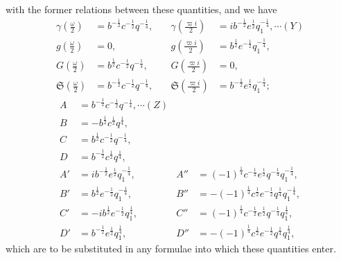 \documentclass[12pt,a4paper]{article}
\newcommand{\fS}{\mathfrak{S}}
\begin{document}
\newpage
\setcounter{page}{148}

with the former relations between these quantities, and we have
\begin{align*}
\gamma\!\left(\tfrac{\omega}{2}\right) &= b^{-\frac{1}{2}} c^{-\frac{1}{2}} q^{-\frac{1}{4}},\quad &\gamma\!\left(\tfrac{\varpi i}{2}\right) &= ib^{-\frac{1}{2}} e^{\frac{1}{2}} q_1^{-\frac{1}{4}}, \cdots(Y)\\
g\!\left(\tfrac{\omega}{2}\right) &= 0,\quad &g\!\left(\tfrac{\varpi i}{2}\right) &= b^{\frac{1}{2}} e^{-\frac{1}{2}} q_1^{-\frac{1}{4}},\\
G\!\left(\tfrac{\omega}{2}\right) &= b^{\frac{1}{2}} c^{-\frac{1}{2}} q^{-\frac{1}{4}},\quad &G\!\left(\tfrac{\varpi i}{2}\right) &= 0,\\
\fS\!\left(\tfrac{\omega}{2}\right) &= b^{-\frac{1}{2}} c^{-\frac{1}{2}} q^{-\frac{1}{4}},\quad &\fS\!\left(\tfrac{\varpi i}{2}\right) &= b^{-\frac{1}{2}} e^{\frac{1}{2}} q_1^{-\frac{1}{4}};
\end{align*}
\begin{align*}
A &= b^{-\frac{1}{2}} c^{-\frac{1}{2}} q^{-\frac{1}{4}}, \cdots(Z)\\
B &= -b^{\frac{1}{2}} c^{\frac{1}{2}} q^{\frac{1}{4}},\\
C &= b^{\frac{1}{2}} c^{-\frac{1}{2}} q^{-\frac{1}{4}},\\
D &= b^{-\frac{1}{2}} c^{\frac{1}{2}} q^{\frac{1}{4}},\\[4pt]
A' &= ib^{-\frac{1}{2}} e^{\frac{1}{2}} q_1^{-\frac{1}{4}},\quad &A'' &= (-1)^{\frac{1}{4}} c^{-\frac{1}{2}} e^{\frac{1}{2}} q^{-\frac{1}{4}} q_1^{-\frac{1}{4}},\\
B' &= b^{\frac{1}{2}} e^{-\frac{1}{2}} q_1^{-\frac{1}{4}},\quad &B'' &= -(-1)^{\frac{1}{4}} c^{\frac{1}{2}} e^{-\frac{1}{2}} q^{\frac{1}{4}} q_1^{-\frac{1}{4}},\\
C' &= -ib^{\frac{1}{2}} e^{-\frac{1}{2}} q_1^{\frac{1}{4}},\quad &C'' &= (-1)^{\frac{1}{4}} c^{-\frac{1}{2}} e^{\frac{1}{2}} q^{-\frac{1}{4}} q_1^{\frac{1}{4}},\\
D' &= b^{-\frac{1}{2}} e^{\frac{1}{2}} q_1^{\frac{1}{4}},\quad &D'' &= -(-1)^{\frac{1}{4}} c^{\frac{1}{2}} e^{-\frac{1}{2}} q^{\frac{1}{4}} q_1^{\frac{1}{4}},
\end{align*}
which are to be substituted in any formulae into which these quantities enter.
\end{document}
